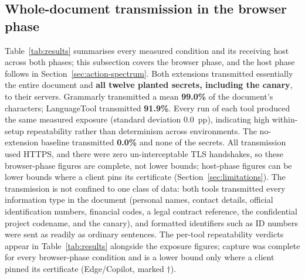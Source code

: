 \documentclass[10pt,conference,a4paper]{IEEEtran}
\begin{document}
\subsection{Whole-document transmission in the browser phase}

Table~\ref{tab:results} summarises every measured condition and its receiving host across
both phases; this subsection covers the browser phase, and the host phase follows in
Section~\ref{sec:action-spectrum}. Both
extensions transmitted essentially the entire document and \textbf{all twelve planted
secrets, including the canary}, to their servers. Grammarly transmitted a mean
\textbf{99.0\%} of the document's characters; LanguageTool transmitted \textbf{91.9\%}.
Every run of each tool produced the same measured exposure (standard deviation 0.0~pp),
indicating high within-setup repeatability rather than determinism across environments. The
no-extension baseline transmitted \textbf{0.0\%} and none of the secrets. All transmission
used HTTPS, and there were zero un-interceptable TLS handshakes, so these browser-phase
figures are complete, not lower bounds; host-phase figures can be lower bounds where a
client pins its certificate (Section~\ref{sec:limitations}). The transmission is not confined
to one class of data: both tools transmitted every information type in the document (personal
names, contact details, official identification numbers, financial codes, a legal contract
reference, the confidential project codename, and the canary), and formatted identifiers
such as ID numbers were sent as readily as ordinary sentences. The per-tool
repeatability verdicts appear in Table~\ref{tab:results} alongside the exposure figures;
capture was complete for every browser-phase condition and is a lower bound only where a
client pinned its certificate (Edge/Copilot, marked $\dagger$).
\end{document}
